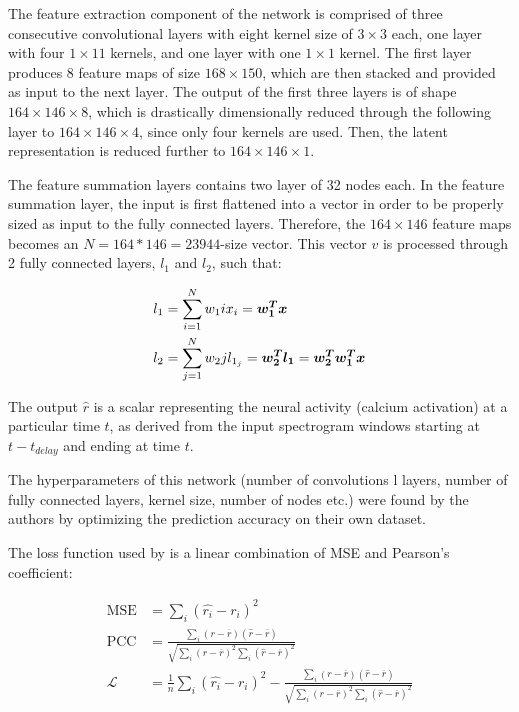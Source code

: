 The feature extraction component of the network is comprised of three consecutive convolutional layers with eight kernel size of $3 \times 3$ each, one layer with four $1 \times 1 1$ kernels, and one layer with one $1 \times 1$ kernel. The first layer produces 8 feature maps of size $168 \times 150$, which are then stacked and provided as input to the next layer. The output of the first three layers is of shape $164 \times 146 \times 8$, which is drastically dimensionally reduced through the following layer to $164 \times 146 \times 4$, since only four kernels are used. Then, the latent representation is reduced further to $164 \times 146 \times 1$.

The feature summation layers contains two layer of 32 nodes each. In the feature summation layer, the input is first flattened into a vector in order to be properly sized as input to the fully connected layers. Therefore, the $164 \times 146$ feature maps becomes an $N = 164 * 146 = 23944$-size vector. This vector $v$ is processed through 2 fully connected layers, $l_1$ and $l_2$, such that:

\begin{align}
	l_1 &= \sum_{i=1}^N w_1i x_i = \bm{w_1^T}\bm{x} \\
	l_2 &= \sum_{j=1}^N w_2j l_{1_j} = \bm{w_2^T}\bm{l_1} = \bm{w_2^T}\bm{w_1^T}\bm{x}
\end{align}


The output $\hat{r}$ is a scalar representing the neural activity (calcium activation) at a particular time $t$, as derived from the input spectrogram windows starting at $t - t_{delay}$ and ending at time $t$.

The hyperparameters of this network (number of convolutions l layers, number of fully connected layers, kernel size, number of nodes etc.) were found by the authors by optimizing the prediction accuracy on their own dataset.

The loss function used by \parencite{keshishianEstimatingInterpretingNonlinear2020} is a linear combination of MSE and Pearson's coefficient:

\begin{align}
	\mathrm{MSE} &= \sum_i (\hat{r_i} -r_i)^2 \\
	\mathrm{PCC} &= \frac{\sum _i (r - \overline{r}) (\hat{r} - \overline{r})}{\sqrt{\sum _i (r - \overline{r})^2 \sum _i (\hat{r} - \overline{r})^2}} \\
	\mathcal{L} &= \frac{1}{n} \sum_i (\hat{r_i} -r_i)^2 - \frac{\sum _i (r - \overline{r}) (\hat{r} - \overline{r})}{\sqrt{\sum _i (r - \overline{r})^2 \sum _i (\hat{r} - \overline{r})^2}}
\end{align}

